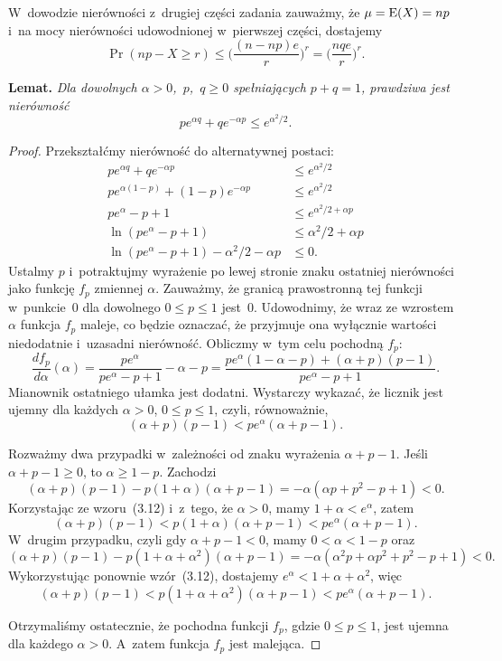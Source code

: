W~dowodzie nierówności z~drugiej części zadania zauważmy, że $\mu=\operatorname{E}(X)=np$ i~na mocy nierówności udowodnionej w~pierwszej części, dostajemy
\[
    \Pr(np-X\ge r) \le \biggl(\frac{(n-np)e}{r}\biggr)^r = \biggl(\frac{nqe}{r}\biggr)^r.
\]

\exercise %

\noindent\textsf{\textbf{Lemat.}} \textit{Dla dowolnych $\alpha>0$,~\/$p$,~\/$q\ge0$ spełniających\/ $p+q=1$, prawdziwa jest nierówność}
	\[
		pe^{\alpha q}+qe^{-\alpha p} \le e^{\alpha^2\!/2}.
	\]
\begin{proof}
	Przekształćmy nierówność do alternatywnej postaci:
	\begin{align*}
		pe^{\alpha q}+qe^{-\alpha p} &\le e^{\alpha^2\!/2} \\
		pe^{\alpha(1-p)}+(1-p)e^{-\alpha p} &\le e^{\alpha^2\!/2} \\
		pe^\alpha-p+1 &\le e^{\alpha^2\!/2+\alpha p} \\
		\ln(pe^\alpha-p+1) &\le \alpha^2\!/2+\alpha p \\
		\ln(pe^\alpha-p+1)-\alpha^2\!/2-\alpha p &\le 0.
	\end{align*}
	Ustalmy $p$ i~potraktujmy wyrażenie po lewej stronie znaku ostatniej nierówności jako funkcję $f_p$ zmiennej $\alpha$. Zauważmy, że granicą prawostronną tej funkcji w~punkcie~0 dla dowolnego $0\le p\le1$ jest~0. Udowodnimy, że wraz ze wzrostem $\alpha$ funkcja $f_p$ maleje, co będzie oznaczać, że przyjmuje ona wyłącznie wartości niedodatnie i~uzasadni nierówność. Obliczmy w~tym celu pochodną $f_p$:
	\[
	    \frac{df_p}{d\alpha}(\alpha) = \frac{pe^\alpha}{pe^\alpha-p+1}-\alpha-p = \frac{pe^\alpha(1-\alpha-p)+(\alpha+p)(p-1)}{pe^\alpha-p+1}.
	\]
	Mianownik ostatniego ułamka jest dodatni. Wystarczy wykazać, że licznik jest ujemny dla każdych $\alpha>0$, $0\le p\le1$, czyli, równoważnie,
	\[
	    (\alpha+p)(p-1) < pe^\alpha(\alpha+p-1).
	\]

	Rozważmy dwa przypadki w~zależności od znaku wyrażenia $\alpha+p-1$. Jeśli $\alpha+p-1\ge0$, to $\alpha\ge1-p$. Zachodzi
	\[
	    (\alpha+p)(p-1)-p(1+\alpha)(\alpha+p-1) = -\alpha(\alpha p+p^2-p+1) < 0.
	\]
	Korzystając ze wzoru~(3.12) i~z~tego, że $\alpha>0$, mamy $1+\alpha<e^\alpha$, zatem
	\[
	    (\alpha+p)(p-1) < p(1+\alpha)(\alpha+p-1) < pe^\alpha(\alpha+p-1).
	\]
	W~drugim przypadku, czyli gdy $\alpha+p-1<0$, mamy $0<\alpha<1-p$ oraz
	\[
	    (\alpha+p)(p-1)-p(1+\alpha+\alpha^2)(\alpha+p-1) = -\alpha(\alpha^2p+\alpha p^2+p^2-p+1) < 0.
	\]
	Wykorzystując ponownie wzór~(3.12), dostajemy $e^\alpha<1+\alpha+\alpha^2$, więc
	\[
		(\alpha+p)(p-1) < p(1+\alpha+\alpha^2)(\alpha+p-1) < pe^\alpha(\alpha+p-1).
	\]

	Otrzymaliśmy ostatecznie, że pochodna funkcji $f_p$, gdzie $0\le p\le1$, jest ujemna dla każdego $\alpha>0$. A~zatem funkcja $f_p$ jest malejąca.
\end{proof}

